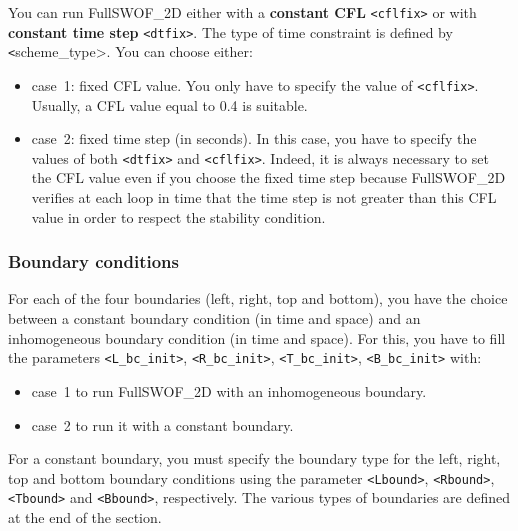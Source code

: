 \documentclass[a4paper, 11pt]{article}
\newcommand{\FullSWOF}{FullSWOF\_2D}
\begin{document}
You can run \FullSWOF{} either with a \textbf{constant CFL} \texttt{<cflfix>} or with \textbf{constant time step} \texttt{<dtfix>}.
The type of time constraint is defined by \texttt<scheme\_type>.
You can choose either:
\begin{itemize}
	\item case~1: fixed CFL value.
	      You only have to specify the value of \texttt{<cflfix>}.
	      Usually, a CFL value equal to 0.4 is suitable.
	\item case~2: fixed time step (in seconds).
	      In this case, you have to specify the values of both \texttt{<dtfix>} and \texttt{<cflfix>}.
	      Indeed, it is always necessary to set the CFL value even if you choose the fixed time step because \FullSWOF{} verifies at each loop in time that the time step is not greater than this CFL value in order to respect the stability condition.
\end{itemize}

\subsubsection{Boundary conditions}
For each of the four boundaries (left, right, top and bottom), you have the choice between a constant boundary condition (in time and space) and an inhomogeneous boundary condition (in time and space).
For this, you have to fill the parameters \texttt{<L\_bc\_init>}, \texttt{<R\_bc\_init>}, \texttt{<T\_bc\_init>}, \texttt{<B\_bc\_init>} with:
\begin{itemize}
	\item case~1 to run \FullSWOF{} with an inhomogeneous boundary.
	\item case~2 to run it with a constant boundary.
\end{itemize}

For a constant boundary, you must specify the boundary type for the left, right, top and bottom boundary conditions using the parameter \texttt{<Lbound>}, \texttt{<Rbound>}, \texttt{<Tbound>} and \texttt{<Bbound>}, respectively.
The various types of boundaries are defined at the end of the section.
\end{document}
